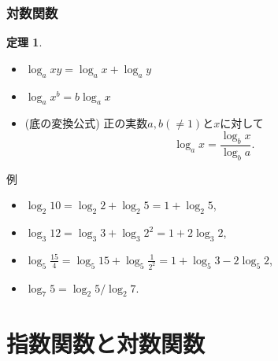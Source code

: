 \documentclass[dvipdfmx,cjk,10.2pt]{beamer}
\theoremstyle{definition}
\newtheorem{Thm}{定理}[section]
\begin{document}
\begin{frame}
\frametitle{対数関数}   


\begin{Thm}
\begin{itemize}
\item $\log_a xy= \log_a x + \log_a y$
\item $\log_a x^b = b \log_a x$
\item (底の変換公式) 正の実数$a,b(\ne1)$と$x$に対して
$$
\log_a x = \frac{\log_b x}{\log_b a}. 
$$
\end{itemize}
\end{Thm}

例
\begin{itemize}
\item $\log_2 10 = \log_2 2+\log_2 5 =1+ \log_2 5$, 
\item $\log_3 12= \log_3 3 + \log_3 2^2=1+2 \log_3 2$, 
\item $\log_5 \frac{15}{4} = \log_5 15 +\log_5 \frac{1}{2^2} = 1+ \log_5 3 - 2\log_5 2$, 
\item $\log_7 5= \log_2 5 / \log_2 7$. 
\end{itemize}


\end{frame}




\section{指数関数と対数関数}
\end{document}
